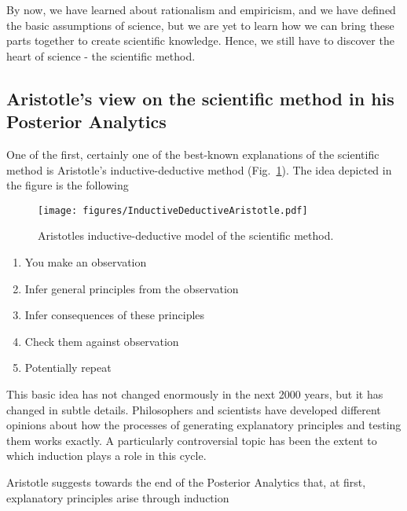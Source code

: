 \documentclass{tufte-book}
\begin{document}
By now, we have learned about rationalism and empiricism, and we have defined the basic assumptions of science, but we are yet to learn how we can bring these parts together to create scientific knowledge. Hence, we still have to discover the heart of science - the scientific method.

\subsection{Aristotle's view on the scientific method in his Posterior Analytics}


One of the first, certainly one of the best-known explanations of the scientific method is Aristotle's inductive-deductive method (Fig.~\ref{fig: InductiveDeductiveAristotle}). The idea depicted in the figure is the following

\begin{figure}
\begin{center}
\texttt{[image: figures/InductiveDeductiveAristotle.pdf]}
\caption{Aristotles inductive-deductive model of the scientific method.}
\label{fig: InductiveDeductiveAristotle}
\end{center}
\end{figure}

\begin{enumerate}
\item You make an observation
\item Infer general principles from the observation
\item Infer consequences of these principles
\item Check them against observation
\item Potentially repeat
\end{enumerate}

This basic idea has not changed enormously in the next 2000 years, but it has changed in subtle details. Philosophers and scientists have developed different opinions about how the processes of generating explanatory principles and testing them works exactly. A particularly controversial topic has been the extent to which induction plays a role in this cycle.

Aristotle suggests towards the end of the Posterior Analytics that, at first, explanatory principles arise through induction
\end{document}
